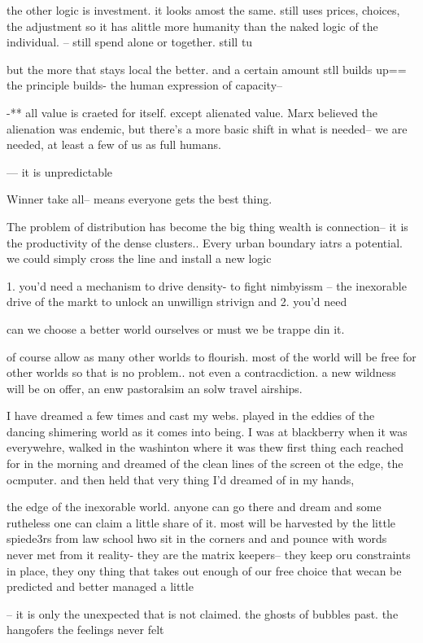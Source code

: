 the other logic is investment. it looks amost the same. still uses prices, choices, the adjustment so it has alittle more humanity than the naked logic of the individual. -- still spend alone or together. still tu

but the more that stays local the better. and a certain amount stll builds up== the principle builds- the human expression of capacity--

-** all value is craeted for itself. except alienated value. Marx believed the alienation was endemic, but there's a more basic shift in what is needed-- we are needed, at least a few of us as full humans.

--- it is unpredictable

Winner take all-- means everyone gets the best thing. 

The problem of distribution has become the big thing
wealth is connection-- it is the productivity of the dense clusters.. 
Every urban boundary iatrs a potential. we could simply cross the line and install a new logic

1. you'd need a mechanism to drive density- to fight nimbyissm -- the inexorable drive of the markt to unlock an unwillign strivign 
and 
2. you'd need

can we choose a better world ourselves or must we be trappe din it.

of course allow as many other worlds to flourish. most of the world will be free for other worlds so that is no problem.. not even a contracdiction. a new wildness will be on offer, an enw pastoralsim an solw travel airships. 

I have dreamed a few times and cast my webs. played in the eddies of the dancing shimering world as it comes into being. I was at blackberry when it was everywehre, walked in the washinton where it was thew first thing each reached for in the morning and dreamed of the clean lines of the screen ot the edge, the ocmputer. and then held that very thing I'd dreamed of in my hands,

the edge of the inexorable world. anyone can go there and dream and some rutheless one can claim a little share of it.
most will be harvested by the little spiede3rs from law school hwo sit in the corners and and pounce with words never met from it
reality- they are the matrix keepers-- they keep oru constraints in place, they ony thing that takes out enough of our free choice that wecan be predicted and better managed a little

-- it is only the unexpected that is not claimed.
the ghosts of bubbles past.
the hangofers
the feelings never felt

